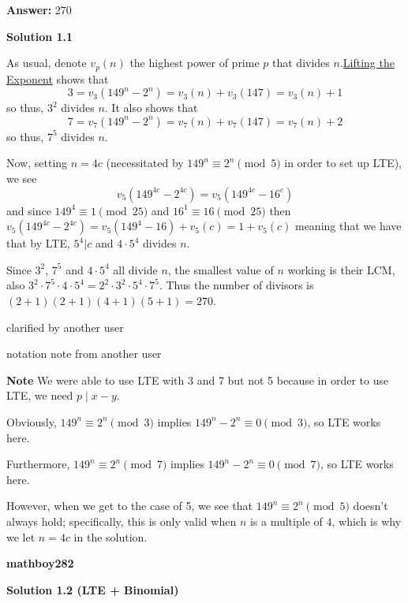 \begin{enumerate}
 \textbf{Answer: }270



\textbf{Solution 1.1}

As usual, denote $v_p(n)$ the highest power of prime $p$ that divides $n$.\href{https://artofproblemsolving.com/wiki/index.php?title=Lifting\_the\_Exponent}{Lifting the Exponent} shows that 
 \[3=v_3(149^n-2^n) = v_3(n) + v_3(147) = v_3(n)+1\] so thus, $3^2$ divides $n$. It also shows that 
 \[7=v_7(149^n-2^n) = v_7(n) + v_7(147) = v_7(n)+2\] so thus, $7^5$ divides $n$. 

 
Now, setting $n = 4c$ (necessitated by $149^n \equiv 2^n \pmod 5$ in order to set up LTE), we see 
 \[v_5(149^{4c}-2^{4c}) = v_5(149^{4c}-16^{c})\] and since $149^{4} \equiv 1 \pmod{25}$ and $16^1 \equiv 16 \pmod{25}$ then $v_5(149^{4c}-2^{4c})=v_5(149^4-16)+v_5(c)=1+v_5(c)$ meaning that we have that by LTE, $5^4 | c$ and $4 \cdot 5^4$ divides $n$. 

 Since $3^2$, $7^5$ and $4\cdot 5^4$ all divide $n$, the smallest value of $n$ working is their LCM, also $3^2 \cdot 7^5 \cdot 4 \cdot 5^4 = 2^2 \cdot 3^2 \cdot 5^4 \cdot 7^5$. Thus the number of divisors is $(2+1)(2+1)(4+1)(5+1) = \boxed{270}$.

 clarified by another user 

 notation note from another user

 \textbf{Note} We were able to use LTE with 3 and 7 but not 5 because in order to use LTE, we need \( p \mid x-y \).

 Obviously, \( 149^n \equiv 2^n \pmod{3} \) implies \( 149^n - 2^n \equiv 0 \pmod{3} \), so LTE works here.

 Furthermore, \( 149^n \equiv 2^n \pmod{7} \) implies \( 149^n - 2^n \equiv 0 \pmod{7} \), so LTE works here.

 However, when we get to the case of 5, we see that \( 149^n \equiv 2^n \pmod{5} \) doesn't always hold; specifically, this is only valid when \( n \) is a multiple of \( 4 \), which is why we let \( n = 4c \) in the solution.

 \textbf{mathboy282}

 



\textbf{Solution 1.2 (LTE + Binomial)}


\end{enumerate}
